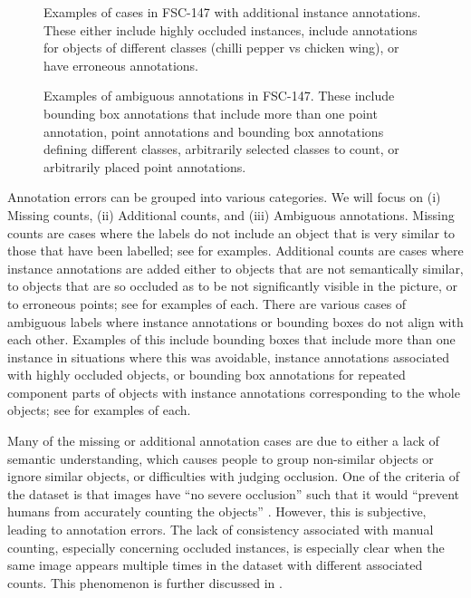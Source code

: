 \documentclass[../thesis.tex]{subfiles}
\begin{document}
\begin{figure}     
    \centering
    \fontsize{8}{8}\selectfont
    
    \caption{Examples of cases in FSC-147 with additional instance annotations. These either include highly occluded instances, include annotations for objects of different classes (\eg chilli pepper vs chicken wing), or have erroneous annotations.}
    \label{fig__FSC133__Fig_annotation_errors_additional}
\end{figure}

\begin{figure}     
    \centering
    \fontsize{8}{8}\selectfont
    
    \caption{Examples of ambiguous annotations  in FSC-147. 
    These include bounding box annotations that include more than one point annotation, point annotations and bounding box annotations defining different classes, arbitrarily selected classes to count, or arbitrarily placed point annotations.
     }
    \label{fig__FSC133__Fig_annotation_errors_ambiguous}
\end{figure}
Annotation errors can be grouped into various categories. We will focus on (i) Missing counts, (ii) Additional counts, and (iii) Ambiguous annotations.
Missing counts are cases where the labels do not include an object that is very similar to those that have been labelled; see 
 for examples.
Additional counts are cases where instance annotations are added either to objects that are not semantically similar, to objects that are so occluded as to be not significantly visible in the picture, or to erroneous points; see  for examples of each.
There are various cases of ambiguous labels where instance annotations or bounding boxes do not align with each other.
Examples of this include bounding boxes that include more than one instance in situations where this was avoidable, instance annotations associated with highly occluded objects, or bounding box annotations for repeated component parts of objects with instance annotations corresponding to the whole objects; see  for examples of each.

Many of the missing or additional annotation cases are due to either a lack of semantic understanding, which causes people to group non-similar objects or ignore similar objects, or difficulties with judging occlusion. 
One of the criteria of the dataset is that images have ``no severe occlusion'' such that it would ``prevent humans from accurately counting the objects'' \cite{ranjan2021Famnet}. 
However, this is subjective, leading to annotation errors. 
The lack of consistency associated with manual counting, especially concerning occluded instances, is especially clear when the same image appears multiple times in the dataset with different associated counts. This phenomenon is further discussed in .
\end{document}
